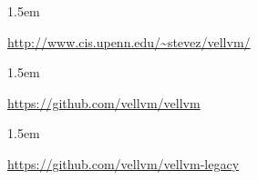 \documentclass[12pt,twoside]{article}
\begin{document}
\begin{mddefinitions}%


\begin{mdbmarginx}{}{}{}{1.5em}%
\begin{mddefdata}%
\href{http://www.cis.upenn.edu/~stevez/vellvm/}{{\ttfamily http://\hspace{0pt}www.\hspace{0pt}cis.\hspace{0pt}upenn.\hspace{0pt}edu/\hspace{0pt}\textasciitilde{}stevez/\hspace{0pt}vellvm/\hspace{0pt}}}
\end{mddefdata}%
\end{mdbmarginx}%


\begin{mdbmarginx}{}{}{}{1.5em}%
\begin{mddefdata}%
\href{https://github.com/vellvm/vellvm}{{\ttfamily https://\hspace{0pt}github.\hspace{0pt}com/\hspace{0pt}vellvm/\hspace{0pt}vellvm}}
\end{mddefdata}%
\end{mdbmarginx}%


\begin{mdbmarginx}{}{}{}{1.5em}%
\begin{mddefdata}%
\href{https://github.com/vellvm/vellvm-legacy}{{\ttfamily https://\hspace{0pt}github.\hspace{0pt}com/\hspace{0pt}vellvm/\hspace{0pt}vellvm-\hspace{0pt}legacy}}%
\end{mddefdata}%
\end{mdbmarginx}%
\end{mddefinitions}%
\end{document}
